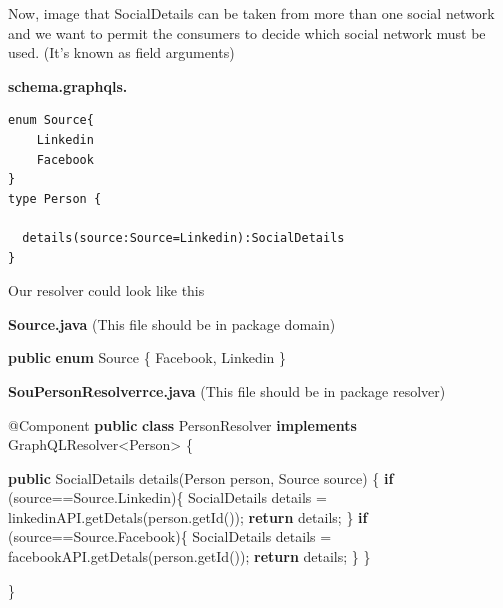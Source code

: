 \documentclass[]{book}
\newenvironment{Shaded}{\begin{snugshade}}{\end{snugshade}}
\newcommand{\KeywordTok}[1]{\textcolor[rgb]{0.13,0.29,0.53}{\textbf{#1}}}
\newcommand{\FunctionTok}[1]{\textcolor[rgb]{0.00,0.00,0.00}{#1}}
\newcommand{\BuiltInTok}[1]{#1}
\newcommand{\AttributeTok}[1]{\textcolor[rgb]{0.77,0.63,0.00}{#1}}
\newcommand{\NormalTok}[1]{#1}
\begin{document}
Now, image that SocialDetails can be taken from more than one social
network and we want to permit the consumers to decide which social
network must be used. (It's known as field arguments)

\textbf{schema.graphqls.}

\begin{verbatim}
enum Source{
    Linkedin
    Facebook
}
type Person {

  details(source:Source=Linkedin):SocialDetails
}
\end{verbatim}

Our resolver could look like this

\textbf{Source.java} (This file should be in package domain)

\begin{Shaded}
\begin{Highlighting}[]
\KeywordTok{public} \KeywordTok{enum} \BuiltInTok{Source}\NormalTok{ \{}
\NormalTok{    Facebook,}
\NormalTok{    Linkedin}
\NormalTok{\}}
\end{Highlighting}
\end{Shaded}

\textbf{SouPersonResolverrce.java} (This file should be in package
resolver)

\begin{Shaded}
\begin{Highlighting}[]
\AttributeTok{@Component}
\KeywordTok{public} \KeywordTok{class}\NormalTok{ PersonResolver }\KeywordTok{implements}\NormalTok{ GraphQLResolver<Person> \{}
    
    \KeywordTok{public}\NormalTok{ SocialDetails }\FunctionTok{details}\NormalTok{(Person person, }\BuiltInTok{Source}\NormalTok{ source) \{}
        \KeywordTok{if}\NormalTok{ (source==}\BuiltInTok{Source}\NormalTok{.}\FunctionTok{Linkedin}\NormalTok{)\{}
\NormalTok{            SocialDetails details = linkedinAPI.}\FunctionTok{getDetals}\NormalTok{(person.}\FunctionTok{getId}\NormalTok{());}
            \KeywordTok{return}\NormalTok{ details;}
\NormalTok{        \}}
        \KeywordTok{if}\NormalTok{ (source==}\BuiltInTok{Source}\NormalTok{.}\FunctionTok{Facebook}\NormalTok{)\{}
\NormalTok{            SocialDetails details = facebookAPI.}\FunctionTok{getDetals}\NormalTok{(person.}\FunctionTok{getId}\NormalTok{());}
            \KeywordTok{return}\NormalTok{ details;}
\NormalTok{        \} }
\NormalTok{    \}}
    
\NormalTok{\}}
\end{Highlighting}
\end{Shaded}
\end{document}

